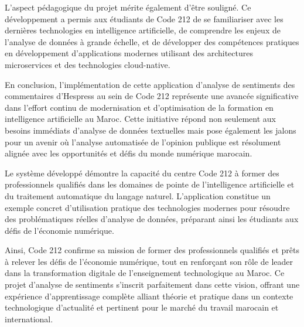 L'aspect pédagogique du projet mérite également d'être souligné. Ce développement a permis aux étudiants de Code 212 de se familiariser avec les dernières technologies en intelligence artificielle, de comprendre les enjeux de l'analyse de données à grande échelle, et de développer des compétences pratiques en développement d'applications modernes utilisant des architectures microservices et des technologies cloud-native.

En conclusion, l'implémentation de cette application d'analyse de sentiments des commentaires d'Hespress au sein de Code 212 représente une avancée significative dans l'effort continu de modernisation et d'optimisation de la formation en intelligence artificielle au Maroc. Cette initiative répond non seulement aux besoins immédiats d'analyse de données textuelles mais pose également les jalons pour un avenir où l'analyse automatisée de l'opinion publique est résolument alignée avec les opportunités et défis du monde numérique marocain.

Le système développé démontre la capacité du centre Code 212 à former des professionnels qualifiés dans les domaines de pointe de l'intelligence artificielle et du traitement automatique du langage naturel. L'application constitue un exemple concret d'utilisation pratique des technologies modernes pour résoudre des problématiques réelles d'analyse de données, préparant ainsi les étudiants aux défis de l'économie numérique.

Ainsi, Code 212 confirme sa mission de former des professionnels qualifiés et prêts à relever les défis de l'économie numérique, tout en renforçant son rôle de leader dans la transformation digitale de l'enseignement technologique au Maroc. Ce projet d'analyse de sentiments s'inscrit parfaitement dans cette vision, offrant une expérience d'apprentissage complète alliant théorie et pratique dans un contexte technologique d'actualité et pertinent pour le marché du travail marocain et international.